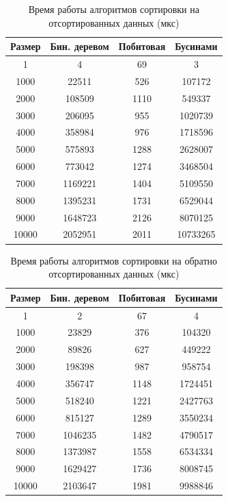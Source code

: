\begin{table}[h]
	\begin{center}
		\captionsetup{justification=raggedright,singlelinecheck=off}
		\caption{Время работы алгоритмов сортировки на отсортированных данных (мкс)}
		\label{tbl:best}
		\begin{tabular}{|c|c|c|c|}
			\hline
			Размер & Бин. деревом &  Побитовая &  Бусинами \\
			\hline
			1 & 4 & 69 & 3\\
			\hline
			1000 & 22511 & 526 & 107172\\
			\hline
			2000 & 108509 & 1110 & 549337\\
			\hline
			3000 & 206095 & 955 & 1020739\\
			\hline
			4000 & 358984 & 976 & 1718596\\
			\hline
			5000 & 575893 & 1288 & 2628007\\
			\hline
			6000 & 773042 & 1274 & 3468504\\
			\hline
			7000 & 1169221 & 1404 & 5109550\\
			\hline
			8000 & 1395231 & 1731 & 6529044\\
			\hline
			9000 & 1648723 & 2126 & 8070125\\
			\hline
			10000 & 2052951 & 2011 & 10733265\\
			\hline
		\end{tabular}
	\end{center}
	
\end{table}

\begin{table}[h]
	\begin{center}
		\captionsetup{justification=raggedright,singlelinecheck=off}
		\caption{ Время работы алгоритмов сортировки на обратно	отсортированных данных (мкс)}
		\label{tbl:wor}
		\begin{tabular}{|c|c|c|c|}
			\hline
			Размер & Бин. деревом &  Побитовая &  Бусинами \\
			\hline
			1 & 2 & 67 & 4\\
			\hline
			1000 & 23829 & 376 & 104320\\
			\hline
			2000 & 89826 & 627 & 449222\\
			\hline
			3000 & 198398 & 987 & 958754\\
			\hline
			4000 & 356747 & 1148 & 1724451\\
			\hline
			5000 & 518240 & 1221 & 2427763\\
			\hline
			6000 & 815127 & 1289 & 3550234\\
			\hline
			7000 & 1046235 & 1482 & 4790517\\
			\hline
			8000 & 1373987 & 1558 & 6534334\\
			\hline
			9000 & 1629427 & 1736 & 8008745\\
			\hline
			10000 & 2103647 & 1981 & 9988846\\
			\hline
		\end{tabular}
	\end{center}
	
\end{table}

